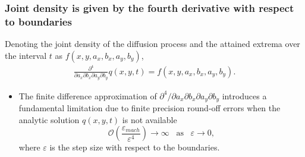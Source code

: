 \documentclass{beamer}
\begin{document}
\begin{frame}
  \frametitle{Joint density is given by the fourth derivative with respect to boundaries}
  Denoting the joint density of the diffusion process and the attained extrema over the interval $t$ as
  $f(x,y,a_x,b_x,a_y,b_y)$,
  \begin{align*}
  \frac{\partial^4}{\partial a_x \partial b_x \partial a_y \partial b_y} q(x,y,t) = f(x,y,a_x,b_x,a_y,b_y).
  \end{align*}

  \begin{itemize}
  \item The finite difference approximation of
    $\partial^4/\partial a_x \partial b_x \partial a_y \partial b_y$
    introduces a fundamental limitation due to finite precision
    round-off errors when the analytic solution $q(x,y,t)$ is not available
    \[
      \mathcal{O}\left(\frac{\varepsilon_{mach}}{\varepsilon^4} \right) \to \infty \,\,\, \mbox{ as } \,\,\, \varepsilon \to 0,
    \]
    where $\varepsilon$ is the step size with respect to the boundaries.
  \end{itemize}
\end{frame}
\end{document}
